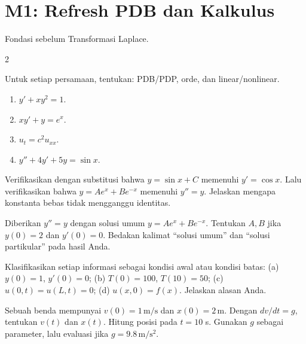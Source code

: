 \documentclass[10pt,a4paper]{article}
\newcommand{\level}[1]{\colorbox{levelbg}{\scriptsize\strut #1}}
\newcommand{\src}[1]{\colorbox{sourcebg}{\scriptsize\strut #1}}
\begin{document}
\section*{M1: Refresh PDB dan Kalkulus}
{\color{iteraGray}\small Fondasi sebelum Transformasi Laplace.}\par\vspace{1mm}
\begin{multicols}{2}
\begin{qbox}[title={M1.1: Klasifikasi persamaan diferensial\hfill \level{L1}\;\src{Boas}}]
\small Untuk setiap persamaan, tentukan: PDB/PDP, orde, dan linear/nonlinear.
\begin{enumerate}
\item $y'+xy^2=1$.
\item $xy'+y=e^x$.
\item $u_t=c^2u_{xx}$.
\item $y''+4y'+5y=\sin x$.
\end{enumerate}
\end{qbox}
\begin{qbox}[title={M1.2: Verifikasi solusi\hfill \level{L1}\;\src{Boas}}]
\small Verifikasikan dengan substitusi bahwa $y=\sin x+C$ memenuhi $y'=\cos x$. Lalu verifikasikan bahwa $y=Ae^x+Be^{-x}$ memenuhi $y''=y$. Jelaskan mengapa konstanta bebas tidak mengganggu identitas.
\end{qbox}
\begin{qbox}[title={M1.3: Solusi umum dan solusi partikular\hfill \level{L2}\;\src{Boas}}]
\small Diberikan $y''=y$ dengan solusi umum $y=Ae^x+Be^{-x}$. Tentukan $A,B$ jika $y(0)=2$ dan $y'(0)=0$. Bedakan kalimat ``solusi umum'' dan ``solusi partikular'' pada hasil Anda.
\end{qbox}
\begin{qbox}[title={M1.4: Kondisi awal atau kondisi batas?\hfill \level{L1}\;\src{Var}}]
\small Klasifikasikan setiap informasi sebagai kondisi awal atau kondisi batas: (a) $y(0)=1$, $y'(0)=0$; (b) $T(0)=100$, $T(10)=50$; (c) $u(0,t)=u(L,t)=0$; (d) $u(x,0)=f(x)$. Jelaskan alasan Anda.
\end{qbox}
\begin{qbox}[title={M1.5: Benda jatuh\hfill \level{L2}\;\src{PR}}]
\small Sebuah benda mempunyai $v(0)=1\,\mathrm{m/s}$ dan $x(0)=2\,\mathrm m$. Dengan $dv/dt=g$, tentukan $v(t)$ dan $x(t)$. Hitung posisi pada $t=10$ s. Gunakan $g$ sebagai parameter, lalu evaluasi jika $g=9.8\,\mathrm{m/s^2}$.
\end{qbox}
\begin{qbox}[title={M1.6: Massa-pegas\hfill \level{L2}\;\src{PR}}]

\end{qbox}
\end{multicols}
\end{document}
